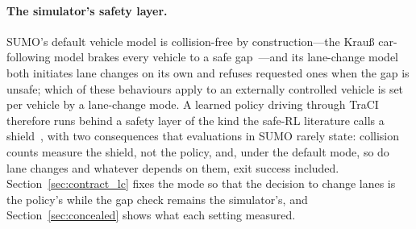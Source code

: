 \paragraph{The simulator's safety layer.}
SUMO's default vehicle model is collision-free by construction---the Krau{\ss} car-following model brakes every vehicle to a safe gap~\cite{krauss1998microscopic}---and its lane-change model~\cite{erdmann2015lane} both initiates lane changes on its own and refuses requested ones when the gap is unsafe; which of these behaviours apply to an externally controlled vehicle is set per vehicle by a lane-change mode. A learned policy driving through TraCI therefore runs behind a safety layer of the kind the safe-RL literature calls a shield~\cite{alshiekh2018safe,garcia2015comprehensive}, with two consequences that evaluations in SUMO rarely state: collision counts measure the shield, not the policy, and, under the default mode, so do lane changes and whatever depends on them, exit success included. Section~\ref{sec:contract_lc} fixes the mode so that the decision to change lanes is the policy's while the gap check remains the simulator's, and Section~\ref{sec:concealed} shows what each setting measured.
